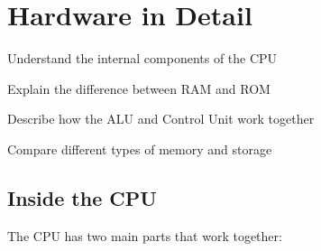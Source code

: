 
\chapter{Hardware in Detail}
\label{ch:hardware-detail}

\begin{objectives}
  \item Understand the internal components of the CPU
  \item Explain the difference between RAM and ROM
  \item Describe how the ALU and Control Unit work together
  \item Compare different types of memory and storage
\end{objectives}


\section{Inside the CPU}
\label{sec:inside-cpu}

The CPU has two main parts that work together:

